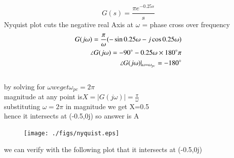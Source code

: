 \documentclass[journal,12pt,twocolumn]{IEEEtran}
\renewcommand\thesection{\arabic{section}}
\begin{document}
\begin{enumerate}[label=\arabic*.,ref=\thesection.\theenumi]
\begin{itemize}
\begin{equation*}
G(s)=\frac{\pi e^{-0.25s}}{s}
\end{equation*}
 Nyquist plot cuts the negative real
Axis at $\omega$ = phase cross over frequency
\begin{align}
 G(j\omega)=\frac{\pi}{\omega}(-\sin{0.25\omega}-j\cos{0.25\omega})
\\ \angle G(j\omega)=-90\degree-0.25\omega\times180\degree \pi
\\
\angle G(j\omega)|_{\omega=\omega_{pc}}=-180\degree
\end{align}
\\ by solving for $\omega we get \omega_{pc}=2\pi$
\\ magnitude at any point is$ X=|G(j\omega)|=\frac{\pi}{\omega}$
\\ substituting $\omega=2\pi$ in magnitude we get X=0.5
\\ hence it intersects at (-0.5,0j) so answer is A

\end{itemize}


{}

\begin{figure}
  \texttt{[image: ./figs/nyquist.eps]}
\end{figure}

 we can verify with the following plot that it intersects at (-0.5,0j)



\end{enumerate}
\end{document}
